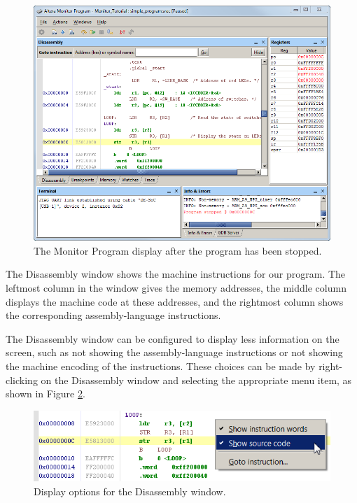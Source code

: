 \documentclass[11pt, twoside, pdftex]{article}
\begin{document}
\begin{figure}[H]
   \begin{center}
      \includegraphics[scale=0.6]{screenshots/figure22.png}
   \end{center}
   \caption{The Monitor Program display after the program has been stopped.} 
   \label{fig:AMP_stoppedprogram_arm}
\end{figure}

The Disassembly window shows the machine
instructions for our program.
The leftmost column in the window gives the memory addresses,
the middle column displays the machine code at these addresses,
and the rightmost column shows the corresponding
assembly-language instructions.

The Disassembly window can be configured to display less information on the screen, such as 
not showing the assembly-language instructions or not showing the machine encoding of the instructions. These choices can 
be made by right-clicking on the Disassembly window and selecting
the appropriate menu item, as shown in Figure \ref{fig:AMP_disassemblyoptions_arm}.

\begin{figure}[H]
   \begin{center}
      \includegraphics[scale=1]{screenshots/figure23.png}
   \end{center}
   \caption{Display options for the Disassembly window.} 
   \label{fig:AMP_disassemblyoptions_arm}
\end{figure}
\end{document}
